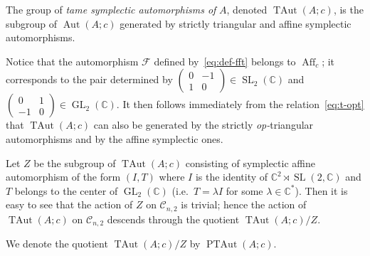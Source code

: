 \documentclass[pdftex]{sigma}
\newcommand{\bb}[1]{\mathbb{#1}}
\newcommand{\smm}[1]{\left(\begin{smallmatrix} #1\end{smallmatrix}\right)}
\DeclareMathOperator{\GL}{GL}
\DeclareMathOperator{\SL}{SL}
\DeclareMathOperator{\Aut}{Aut}
\DeclareMathOperator{\TAut}{TAut}
\DeclareMathOperator{\PTAut}{PTAut}
\DeclareMathOperator{\Aff}{Aff}
\begin{document}
\begin{definition}
\label{def:TAut}
The group of \textit{tame symplectic automorphisms of} \(A\), denoted \(\TAut(A;c)\), is the subgroup of
\(\Aut(A;c)\) generated by strictly triangular and af\/f\/ine symplectic automorphisms.
\end{definition}

Notice that the automorphism \(\mathcal{F}\) def\/ined by~\eqref{eq:def-fft} belongs to \(\Aff_{c}\); it
corresponds to the pair determined by \(\smm{0 & -1
\\
1 & 0}\in \SL_{2}(\bb{C})\) and \(\smm{0 & 1
\\
-1 & 0}\in \GL_{2}(\bb{C})\).
It then follows immediately from the relation~\eqref{eq:t-opt} that \(\TAut(A;c)\) can also be generated by
the strictly \emph{op-}triangular automorphisms and by the af\/f\/ine symplectic ones.

Let \(Z\) be the subgroup of \(\TAut(A;c)\) consisting of symplectic af\/f\/ine automorphism of the form
\((I,T)\) where \(I\) is the identity of \(\bb{C}^{2}\rtimes \SL(2,\bb{C})\) and \(T\) belongs to the
center of \(\GL_{2}(\bb{C})\) (i.e.\
\(T = \lambda I\) for some \(\lambda\in \bb{C}^{*}\)).
Then it is easy to see that the action of \(Z\) on \(\mathcal{C}_{n,2}\) is trivial; hence the action of
\(\TAut(A;c)\) on \(\mathcal{C}_{n,2}\) descends through the quotient \(\TAut(A;c)/Z\).

\begin{definition}
\label{def:PTAut}
We denote the quotient \(\TAut(A;c)/Z\) by \(\PTAut(A;c)\).
\end{definition}
\end{document}
